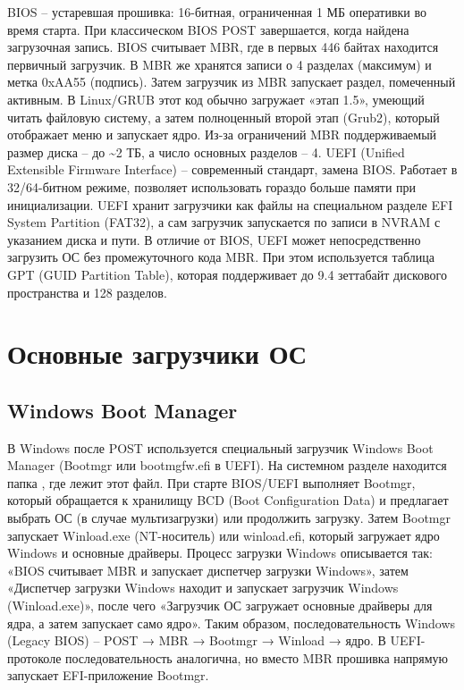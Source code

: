 BIOS -- устаревшая прошивка: 16-битная, ограниченная 1 МБ оперативки во
время старта. При классическом BIOS POST завершается, когда найдена
загрузочная запись. BIOS считывает MBR, где в первых 446 байтах
находится первичный загрузчик. В MBR же хранятся записи о 4 разделах
(максимум) и метка 0xAA55 (подпись). Затем загрузчик из MBR запускает
раздел, помеченный активным. В Linux/GRUB этот код обычно загружает
«этап 1.5», умеющий читать файловую систему, а затем полноценный второй
этап (Grub2), который отображает меню и запускает ядро. Из-за
ограничений MBR поддерживаемый размер диска -- до \textasciitilde2 ТБ, а
число основных разделов -- 4. UEFI (Unified Extensible Firmware
Interface) -- современный стандарт, замена BIOS. Работает в 32/64-битном
режиме, позволяет использовать гораздо больше памяти при инициализации.
UEFI хранит загрузчики как файлы на специальном разделе EFI System
Partition (FAT32), а сам загрузчик запускается по записи в NVRAM с
указанием диска и пути. В отличие от BIOS, UEFI может непосредственно
загрузить ОС без промежуточного кода MBR. При этом используется таблица
GPT (GUID Partition Table), которая поддерживает до 9.4 зеттабайт
дискового пространства и 128 разделов.

\hypertarget{ux43eux441ux43dux43eux432ux43dux44bux435-ux437ux430ux433ux440ux443ux437ux447ux438ux43aux438-ux43eux441}{%
\chapter{Основные загрузчики
ОС}\label{ux43eux441ux43dux43eux432ux43dux44bux435-ux437ux430ux433ux440ux443ux437ux447ux438ux43aux438-ux43eux441}}

\hypertarget{windows-boot-manager}{%
\section{Windows Boot Manager}\label{windows-boot-manager}}

В Windows после POST используется специальный загрузчик Windows Boot
Manager (Bootmgr или bootmgfw.efi в UEFI). На системном разделе
находится папка \EFI\Microsoft\Boot, где лежит этот файл. При старте
BIOS/UEFI выполняет Bootmgr, который обращается к хранилищу BCD (Boot
Configuration Data) и предлагает выбрать ОС (в случае мультизагрузки)
или продолжить загрузку. Затем Bootmgr запускает Winload.exe
(NT-носитель) или winload.efi, который загружает ядро Windows и основные
драйверы. Процесс загрузки Windows описывается так: «BIOS считывает MBR
и запускает диспетчер загрузки Windows», затем «Диспетчер загрузки
Windows находит и запускает загрузчик Windows (Winload.exe)», после чего
«Загрузчик ОС загружает основные драйверы для ядра, а затем запускает
само ядро». Таким образом, последовательность Windows (Legacy BIOS) --
POST → MBR → Bootmgr → Winload → ядро. В UEFI-протоколе
последовательность аналогична, но вместо MBR прошивка напрямую запускает
EFI-приложение Bootmgr.

